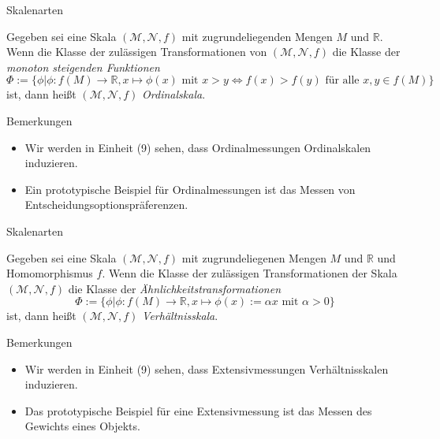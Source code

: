 \documentclass[
  8pt,
  ignorenonframetext,
]{beamer}
\providecommand{\tightlist}{%
  \setlength{\itemsep}{0pt}\setlength{\parskip}{0pt}}
\begin{document}
\begin{frame}{Skalenarten}
\protect\hypertarget{skalenarten-1}{}
\footnotesize
\begin{definition}[Ordinalskala]
\justifying
Gegeben sei eine Skala $(\mathcal{M},\mathcal{N},f)$ mit zugrundeliegenden Mengen
$M$ und $\mathbb{R}$. Wenn die Klasse der zulässigen Transformationen von 
$(\mathcal{M},\mathcal{N},f)$ die Klasse der \textit{monoton steigenden Funktionen} 
\begin{equation}
\Phi := \{\phi| \phi : f(M) \to \mathbb{R}, x \mapsto \phi(x)  \mbox{ mit } x > y \Leftrightarrow f(x) > f(y) \mbox{ für alle } x,y \in f(M)\}
\end{equation}
ist, dann heißt $(\mathcal{M},\mathcal{N},f)$ \textit{Ordinalskala}.
\end{definition}

Bemerkungen

\begin{itemize}
\tightlist
\item
  Wir werden in Einheit (9) sehen, dass Ordinalmessungen Ordinalskalen
  induzieren.
\item
  Ein prototypische Beispiel für Ordinalmessungen ist das Messen von
  Entscheidungsoptionspräferenzen.
\end{itemize}
\end{frame}

\begin{frame}{Skalenarten}
\protect\hypertarget{skalenarten-2}{}
\footnotesize
\begin{definition}[Verhältnisskala]
\justifying
Gegeben sei eine Skala $(\mathcal{M},\mathcal{N},f)$ mit zugrundeliegenen Mengen
$M$ und $\mathbb{R}$ und Homomorphismus $f$. Wenn die Klasse der zulässigen
Transformationen der Skala $(\mathcal{M},\mathcal{N},f)$ die Klasse der 
\textit{Ähnlichkeitstransformationen}
\begin{equation}
\Phi := \{\phi| \phi : f(M) \to \mathbb{R}, x \mapsto \phi(x) := \alpha x \mbox{ mit } \alpha > 0\}
\end{equation}
ist, dann heißt $(\mathcal{M},\mathcal{N},f)$ \textit{Verhältnisskala}.
\end{definition}

Bemerkungen

\begin{itemize}
\tightlist
\item
  Wir werden in Einheit (9) sehen, dass Extensivmessungen
  Verhältnisskalen induzieren.
\item
  Das prototypische Beispiel für eine Extensivmessung ist das Messen des
  Gewichts eines Objekts.
\end{itemize}
\end{frame}
\end{document}
